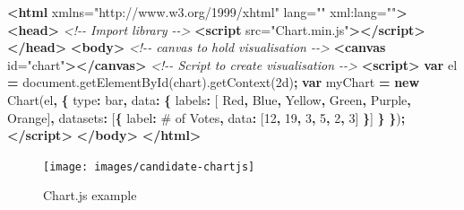 \documentclass[
  10pt,
]{krantz}
\makeatletter
\newenvironment{Shaded}{\begin{snugshade}}{\end{snugshade}}
\newcommand{\AttributeTok}[1]{\textcolor[rgb]{0.61,0.61,0.61}{#1}}
\newcommand{\CommentTok}[1]{\textcolor[rgb]{0.37,0.37,0.37}{\textit{#1}}}
\newcommand{\DataTypeTok}[1]{\textcolor[rgb]{0.27,0.27,0.27}{#1}}
\newcommand{\DecValTok}[1]{\textcolor[rgb]{0.06,0.06,0.06}{#1}}
\newcommand{\KeywordTok}[1]{\textcolor[rgb]{0.27,0.27,0.27}{\textbf{#1}}}
\newcommand{\NormalTok}[1]{#1}
\newcommand{\OperatorTok}[1]{\textcolor[rgb]{0.43,0.43,0.43}{\textbf{#1}}}
\newcommand{\OtherTok}[1]{\textcolor[rgb]{0.37,0.37,0.37}{#1}}
\newcommand{\StringTok}[1]{\textcolor[rgb]{0.5,0.5,0.5}{#1}}
\newcommand{\VariableTok}[1]{\textcolor[rgb]{0,0,0}{#1}}
\newenvironment{kframe}{%
\medskip{}
\setlength{\fboxsep}{.8em}
 \def\at@end@of@kframe{}%
 \ifinner\ifhmode%
  \def\at@end@of@kframe{\end{minipage}}%
  \begin{minipage}{\columnwidth}%
 \fi\fi%
 \def\FrameCommand##1{\hskip\@totalleftmargin \hskip-\fboxsep
 \colorbox{shadecolor}{##1}\hskip-\fboxsep
     \hskip-\linewidth \hskip-\@totalleftmargin \hskip\columnwidth}%
 \MakeFramed {\advance\hsize-\width
   \@totalleftmargin\z@ \linewidth\hsize
   \@setminipage}}%
 {\par\unskip\endMakeFramed%
 \at@end@of@kframe}
\renewenvironment{Shaded}{\begin{kframe}}{\end{kframe}}
\makeatother
\begin{document}
\begin{Shaded}
\begin{Highlighting}[]
\KeywordTok{<html}\OtherTok{ xmlns=}\StringTok{"http://www.w3.org/1999/xhtml"}\OtherTok{ lang=}\StringTok{""}\OtherTok{ xml:lang=}\StringTok{""}\KeywordTok{>}
\KeywordTok{<head>}
  \CommentTok{<!{-}{-} Import library {-}{-}>}
  \KeywordTok{<script}\OtherTok{ src=}\StringTok{"Chart.min.js"}\KeywordTok{></script>}
\KeywordTok{</head>}
\KeywordTok{<body>}
  \CommentTok{<!{-}{-} canvas to hold visualisation {-}{-}>}
  \KeywordTok{<canvas}\OtherTok{ id=}\StringTok{"chart"}\KeywordTok{></canvas>}
  \CommentTok{<!{-}{-} Script to create visualisation {-}{-}>}
  \KeywordTok{<script>}
    \KeywordTok{var}\NormalTok{ el }\OperatorTok{=} \VariableTok{document}\NormalTok{.}\AttributeTok{getElementById}\NormalTok{(}\StringTok{\textquotesingle{}chart\textquotesingle{}}\NormalTok{).}\AttributeTok{getContext}\NormalTok{(}\StringTok{\textquotesingle{}2d\textquotesingle{}}\NormalTok{)}\OperatorTok{;}    
    \KeywordTok{var}\NormalTok{ myChart }\OperatorTok{=} \KeywordTok{new} \AttributeTok{Chart}\NormalTok{(el}\OperatorTok{,} \OperatorTok{\{}
      \DataTypeTok{type}\OperatorTok{:} \StringTok{\textquotesingle{}bar\textquotesingle{}}\OperatorTok{,}
      \DataTypeTok{data}\OperatorTok{:} \OperatorTok{\{}
        \DataTypeTok{labels}\OperatorTok{:}\NormalTok{ [}
          \StringTok{\textquotesingle{}Red\textquotesingle{}}\OperatorTok{,} \StringTok{\textquotesingle{}Blue\textquotesingle{}}\OperatorTok{,} \StringTok{\textquotesingle{}Yellow\textquotesingle{}}\OperatorTok{,} \StringTok{\textquotesingle{}Green\textquotesingle{}}\OperatorTok{,} 
          \StringTok{\textquotesingle{}Purple\textquotesingle{}}\OperatorTok{,} \StringTok{\textquotesingle{}Orange\textquotesingle{}}\NormalTok{]}\OperatorTok{,}
        \DataTypeTok{datasets}\OperatorTok{:}\NormalTok{ [}\OperatorTok{\{}
          \DataTypeTok{label}\OperatorTok{:} \StringTok{\textquotesingle{}\# of Votes\textquotesingle{}}\OperatorTok{,}
          \DataTypeTok{data}\OperatorTok{:}\NormalTok{ [}\DecValTok{12}\OperatorTok{,} \DecValTok{19}\OperatorTok{,} \DecValTok{3}\OperatorTok{,} \DecValTok{5}\OperatorTok{,} \DecValTok{2}\OperatorTok{,} \DecValTok{3}\NormalTok{]}
        \OperatorTok{\}}\NormalTok{]}
      \OperatorTok{\}}
    \OperatorTok{\}}\NormalTok{)}\OperatorTok{;}
  \KeywordTok{</script>}
\KeywordTok{</body>}
\KeywordTok{</html>}
\end{Highlighting}
\end{Shaded}

\begin{figure}[H]

{\centering \texttt{[image: images/candidate-chartjs]} 

}

\caption{Chart.js example}\label{fig:candidate-chartjs}
\end{figure}
\end{document}
